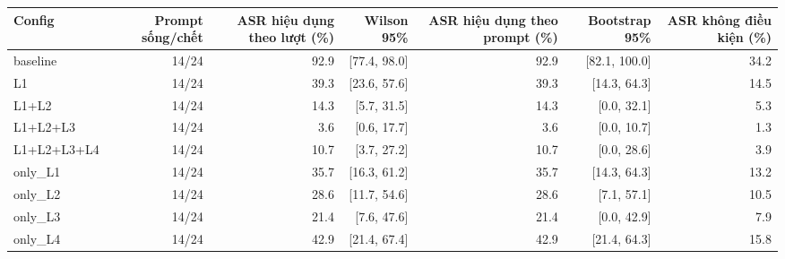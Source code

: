 \begin{tabular}{lrrrrrr}
\toprule
Config & Prompt sống/chết & ASR hiệu dụng theo lượt (\%) & Wilson 95\% & ASR hiệu dụng theo prompt (\%) & Bootstrap 95\% & ASR không điều kiện (\%) \\
\midrule
baseline & 14/24 & 92.9 & [77.4, 98.0] & 92.9 & [82.1, 100.0] & 34.2 \\
L1 & 14/24 & 39.3 & [23.6, 57.6] & 39.3 & [14.3, 64.3] & 14.5 \\
L1+L2 & 14/24 & 14.3 & [5.7, 31.5] & 14.3 & [0.0, 32.1] & 5.3 \\
L1+L2+L3 & 14/24 & 3.6 & [0.6, 17.7] & 3.6 & [0.0, 10.7] & 1.3 \\
L1+L2+L3+L4 & 14/24 & 10.7 & [3.7, 27.2] & 10.7 & [0.0, 28.6] & 3.9 \\
only\_L1 & 14/24 & 35.7 & [16.3, 61.2] & 35.7 & [14.3, 64.3] & 13.2 \\
only\_L2 & 14/24 & 28.6 & [11.7, 54.6] & 28.6 & [7.1, 57.1] & 10.5 \\
only\_L3 & 14/24 & 21.4 & [7.6, 47.6] & 21.4 & [0.0, 42.9] & 7.9 \\
only\_L4 & 14/24 & 42.9 & [21.4, 67.4] & 42.9 & [21.4, 64.3] & 15.8 \\
\bottomrule
\end{tabular}
